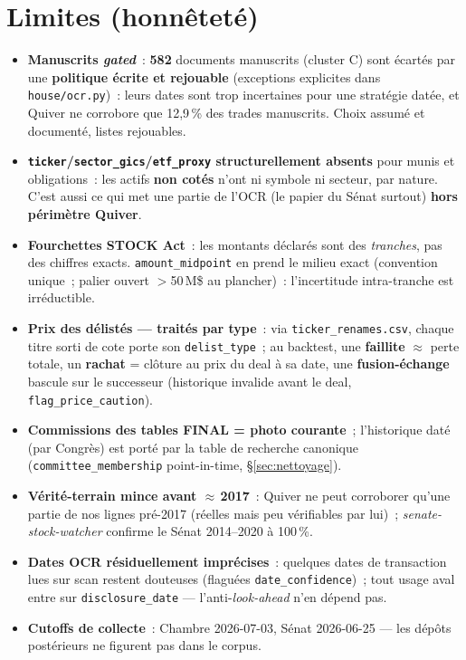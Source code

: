 \documentclass[11pt,a4paper]{article}
\newcommand{\co}[1]{\texttt{\small #1}}
\begin{document}
\section{Limites (honnêteté)}
\label{sec:limites}
\begin{itemize}[nosep,leftmargin=1.5em]
\item \textbf{Manuscrits \emph{gated}}~: \textbf{582} documents manuscrits (cluster C) sont écartés par
une \textbf{politique écrite et rejouable} (exceptions explicites dans \co{house/ocr.py})~: leurs dates
sont trop incertaines pour une stratégie datée, et Quiver ne corrobore que 12,9\,\% des trades manuscrits.
Choix assumé et documenté, listes rejouables.
\item \textbf{\co{ticker}/\co{sector_gics}/\co{etf_proxy} structurellement absents} pour munis et
obligations~: les actifs \textbf{non cotés} n'ont ni symbole ni secteur, par nature. C'est aussi ce qui met
une partie de l'OCR (le papier du Sénat surtout) \textbf{hors périmètre Quiver}.
\item \textbf{Fourchettes STOCK Act}~: les montants déclarés sont des \emph{tranches}, pas des chiffres
exacts. \co{amount_midpoint} en prend le milieu exact (convention unique~; palier ouvert $>$50\,M\$ au
plancher)~: l'incertitude intra-tranche est irréductible.
\item \textbf{Prix des délistés — traités par type}~: via \co{ticker_renames.csv}, chaque titre sorti de
cote porte son \co{delist_type}~; au backtest, une \textbf{faillite} $\approx$ perte totale, un
\textbf{rachat} = clôture au prix du deal à sa date, une \textbf{fusion-échange} bascule sur le successeur
(historique invalide avant le deal, \co{flag_price_caution}).
\item \textbf{Commissions des tables FINAL = photo courante}~; l'historique daté (par Congrès) est porté
par la table de recherche canonique (\co{committee_membership} point-in-time, \S{}\ref{sec:nettoyage}).
\item \textbf{Vérité-terrain mince avant $\approx$\,2017}~: Quiver ne peut corroborer qu'une partie de nos
lignes pré-2017 (réelles mais peu vérifiables par lui)~; \emph{senate-stock-watcher} confirme le Sénat
2014--2020 à 100\,\%.
\item \textbf{Dates OCR résiduellement imprécises}~: quelques dates de transaction lues sur scan restent
douteuses (flaguées \co{date_confidence})~; tout usage aval entre sur \co{disclosure_date} —
l'anti-\emph{look-ahead} n'en dépend pas.
\item \textbf{Cutoffs de collecte}~: Chambre 2026-07-03, Sénat 2026-06-25 — les dépôts postérieurs ne
figurent pas dans le corpus.
\end{itemize}
\end{document}
